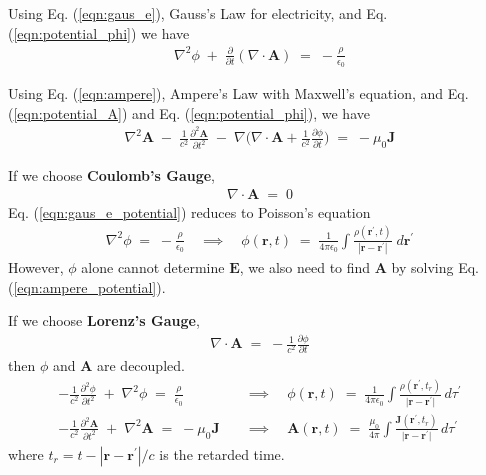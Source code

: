 \documentclass[12pt,a4paper]{article}
\begin{document}
Using Eq. (\ref{eqn:gaus_e}), Gauss's Law for electricity, and Eq. (\ref{eqn:potential_phi}) we have
\begin{align}
	\nabla^{2} \phi \; + \; \frac{\partial}{\partial t} (\nabla \cdot \mathbf{A}) \; = \; -\frac{\rho}{\epsilon_{0}} \label{eqn:gaus_e_potential}
\end{align}

Using Eq. (\ref{eqn:ampere}), Ampere's Law with Maxwell's equation, and Eq. (\ref{eqn:potential_A}) and Eq. (\ref{eqn:potential_phi}), we have
\begin{align}
	\nabla^{2} \mathbf{A} \; - \; \frac{1}{c^{2}} \frac{\partial^{2} \mathbf{A}}{\partial t^{2}} 
	\; - \; 
	\nabla \Bigg(\nabla \cdot \mathbf{A} + \frac{1}{c^{2}} \frac{\partial \phi}{\partial t} \Bigg) 
	\; = \;
	- \mu_{0} \mathbf{J} \label{eqn:ampere_potential}
\end{align}

If we choose \textbf{Coulomb's Gauge}, 
\begin{align}
	\nabla \cdot \mathbf{A} \; = \; 0
\end{align}
Eq. (\ref{eqn:gaus_e_potential}) reduces to Poisson's equation
\begin{align}
	\nabla^{2} \phi \; = \; -\frac{\rho}{\epsilon_{0}} 
	\quad  \implies \quad
	\phi(\mathbf{r}, t) \; = \;
	\frac{1}{4 \pi \epsilon_{0}}\int \frac{\rho(\mathbf{r^{\prime}}, t)}{|\mathbf{r} - \mathbf{r^{\prime}}|} \; d \mathbf{r^{\prime}}
\end{align}
However, $\phi$ alone cannot determine $\mathbf{E}$, we also need to find $\mathbf{A}$ by solving Eq. (\ref{eqn:ampere_potential}).
 
If we choose \textbf{Lorenz's Gauge},
\begin{align}
	\nabla \cdot \mathbf{A} \; = \; -\frac{1}{c^{2}} \frac{\partial \phi}{\partial t}
\end{align}
then $\phi$ and $\mathbf{A}$ are decoupled.
\begin{align}
	-\frac{1}{c^{2}} \frac{\partial^{2} \phi}{\partial t^{2}} \; + \; \nabla^{2} \phi \; = \; \frac{\rho}{\epsilon_{0}}
	\quad &\implies \quad
	\phi(\mathbf{r}, t) \; = \; 
	\frac{1}{4 \pi \epsilon_{0}} 
	\int \frac{\rho (\mathbf{r^{\prime}},
		t_{r})}{|{\mathbf{r} - \mathbf{r^{\prime}}|}} \, d \tau^{\prime}
	 \\
	-\frac{1}{c^{2}} \frac{\partial^{2} \mathbf{A}}{\partial t^{2}} \; + \; \nabla^{2} \mathbf{A} \; = \; - \mu_{0} \mathbf{J}
	\quad &\implies \quad 
	\mathbf{A}(\mathbf{r}, t) \; = \; 
	\frac{\mu_{0}}{4 \pi} 
	\int \frac{\mathbf{J} (\mathbf{r^{\prime}}, t_{r})}{|{\mathbf{r} - \mathbf{r^{\prime}}|}} \, d \tau^{\prime}
\end{align}
where $t_{r} = t - | \mathbf{r} - \mathbf{r^{\prime}}| / c $ is the retarded time.
\end{document}
